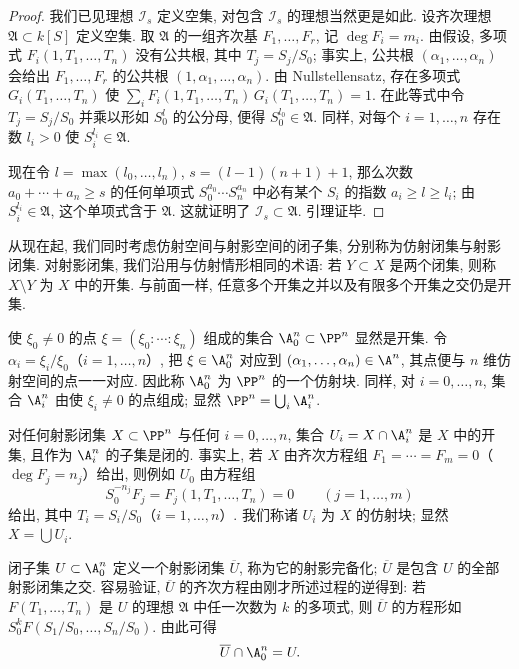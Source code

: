 \begin{proof}
	我们已见理想 $\mathcal I_s$ 定义空集, 对包含 $\mathcal I_s$ 的理想当然更是如此. 设齐次理想 $\mathfrak A \subset k[S]$ 定义空集. 取 $\mathfrak A$ 的一组齐次基 $F_1, \ldots, F_r$, 记 $\deg F_i = m_i$. 由假设, 多项式 $F_i(1, T_1, \ldots, T_n)$ 没有公共根, 其中 $T_j = S_j / S_0$; 事实上, 公共根 $(\alpha_1, \ldots, \alpha_n)$ 会给出 $F_1, \ldots, F_r$ 的公共根 $(1, \alpha_1, \ldots, \alpha_n)$. 由 Nullstellensatz, 存在多项式 $G_i(T_1, \ldots, T_n)$ 使 $\sum_i F_i(1, T_1, \ldots, T_n)\, G_i(T_1, \ldots, T_n) = 1$. 在此等式中令 $T_j = S_j/S_0$ 并乘以形如 $S_0^l$ 的公分母, 便得 $S_0^{l_0} \in \mathfrak A$. 同样, 对每个 $i = 1, \ldots, n$ 存在数 $l_i > 0$ 使 $S_i^{l_i} \in \mathfrak A$.

	现在令 $l = \max(l_0, \ldots, l_n)$, $s = (l-1)(n+1) + 1$, 那么次数 $a_0 + \cdots + a_n \ge s$ 的任何单项式 $S_0^{a_0} \cdots S_n^{a_n}$ 中必有某个 $S_i$ 的指数 $a_i \ge l \ge l_i$; 由 $S_i^{l_i} \in \mathfrak A$, 这个单项式含于 $\mathfrak A$. 这就证明了 $\mathcal I_s \subset \mathfrak A$. 引理证毕.
\end{proof}

从现在起, 我们同时考虑仿射空间与射影空间的闭子集, 分别称为仿射闭集与射影闭集. 对射影闭集, 我们沿用与仿射情形相同的术语: 若 $Y \subset X$ 是两个闭集, 则称 $X \setminus Y$ 为 $X$ 中的开集. 与前面一样, 任意多个开集之并以及有限多个开集之交仍是开集.

使 $\xi_0 \ne 0$ 的点 $\xi = (\xi_0 : \cdots : \xi_n)$ 组成的集合 $\A^n_0 \subset \PP^n$ 显然是开集. 令 $\alpha_i = \xi_i / \xi_0$（$i = 1, \ldots, n$）, 把 $\xi \in \A^n_0$ 对应到 $(\alpha_1, \ldots, \alpha_n) \in \A^n$, 其点便与 $n$ 维仿射空间的点一一对应. 因此称 $\A^n_0$ 为 $\PP^n$ 的一个仿射块. 同样, 对 $i = 0, \ldots, n$, 集合 $\A^n_i$ 由使 $\xi_i \ne 0$ 的点组成; 显然 $\PP^n = \bigcup_i \A^n_i$.

对任何射影闭集 $X \subset \PP^n$ 与任何 $i = 0, \ldots, n$, 集合 $U_i = X \cap \A^n_i$ 是 $X$ 中的开集, 且作为 $\A^n_i$ 的子集是闭的. 事实上, 若 $X$ 由齐次方程组 $F_1 = \cdots = F_m = 0$（$\deg F_j = n_j$）给出, 则例如 $U_0$ 由方程组
\[
	S_0^{-n_j} F_j = F_j(1, T_1, \ldots, T_n) = 0 \qquad (j = 1, \ldots, m)
\]
给出, 其中 $T_i = S_i/S_0$（$i = 1, \ldots, n$）. 我们称诸 $U_i$ 为 $X$ 的仿射块; 显然 $X = \bigcup U_i$.

闭子集 $U \subset \A^n_0$ 定义一个射影闭集 $\overline{U}$, 称为它的射影完备化; $\overline{U}$ 是包含 $U$ 的全部射影闭集之交. 容易验证, $\overline{U}$ 的齐次方程由刚才所述过程的逆得到: 若 $F(T_1, \ldots, T_n)$ 是 $U$ 的理想 $\mathfrak A$ 中任一次数为 $k$ 的多项式, 则 $\overline{U}$ 的方程形如 $S_0^k F(S_1/S_0, \ldots, S_n/S_0)$. 由此可得
\begin{equation}
	\label{eq:1.29}
	\overline{U} \cap \A^n_0 = U.
\end{equation}

